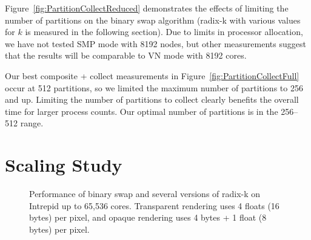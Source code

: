 \documentclass{acm_proc_article-sp}
\begin{document}
Figure~\ref{fig:PartitionCollectReduced} demonstrates the effects of
limiting the number of partitions on the binary swap algorithm (radix-k
with various values for $k$ is measured in the following section).  Due to
limits in processor allocation, we have not tested SMP mode with 8192
nodes, but other measurements suggest that the results will be comparable
to VN mode with 8192 cores.

Our best composite + collect measurements in
Figure~\ref{fig:PartitionCollectFull} occur at 512 partitions, so we
limited the maximum number of partitions to 256 and up.  Limiting the
number of partitions to collect clearly benefits the overall time for
larger process counts.  Our optimal number of partitions is in the 256--512
range.

\section{Scaling Study}
\label{sec:Scaling}

\begin{figure}[htbp]
  \centering
  \hfill
  \caption{Performance of binary swap and several versions of radix-k on
    Intrepid up to 65,536 cores.  Transparent rendering uses 4 floats (16
    bytes) per pixel, and opaque rendering uses 4 bytes + 1 float (8 bytes)
    per pixel.}
  \label{fig:Scaling}
\end{figure}
\end{document}
